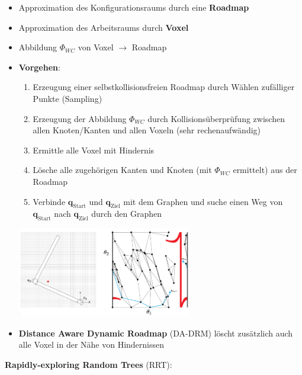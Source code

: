 \begin{itemize}
	\item Approximation des Konfigurationsraums durch eine \textbf{Roadmap}
	\item Approximation des Arbeitsraums durch \textbf{Voxel}
	\item Abbildung $\Phi_{WC}$ von Voxel $\rightarrow$ Roadmap
	\item \textbf{Vorgehen}:
	\begin{enumerate}
		\item Erzeugung einer selbstkollisionsfreien Roadmap durch Wählen zufälliger Punkte (Sampling)
		\item Erzeugung der Abbildung $\Phi_{WC}$ durch Kollisionsüberprüfung zwischen allen Knoten/Kanten und allen Voxeln (sehr rechenaufwändig)
		\item Ermittle alle Voxel mit Hindernis
		\item Lösche alle zugehörigen Kanten und Knoten (mit $\Phi_{WC}$ ermittelt) aus der Roadmap
		\item Verbinde $\mathbf{q}_\text{Start}$ und  $\mathbf{q}_\text{Ziel}$ mit dem Graphen und suche einen Weg von $\mathbf{q}_\text{Start}$ nach $\mathbf{q}_\text{Ziel}$ durch den Graphen
	\end{enumerate}
	\begin{center}
		\includegraphics[width=0.6\textwidth]{images/drm.png}
	\end{center}
	\item \textbf{Distance Aware Dynamic Roadmap} (DA-DRM) löscht zusätzlich auch alle Voxel in der Nähe von Hindernissen
\end{itemize}
\bigskip
\textbf{Rapidly-exploring Random Trees} (RRT):
